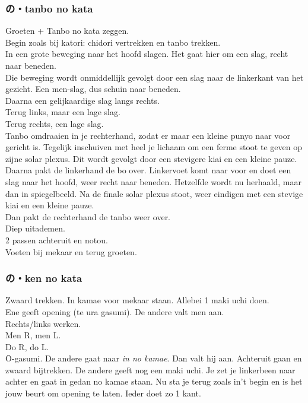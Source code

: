 \subsubsection{の・tanbo no kata}
Groeten + Tanbo no kata zeggen.\\
Begin zoals bij katori: chidori vertrekken en tanbo trekken.\\
In een grote beweging naar het hoofd slagen. Het gaat hier om een slag, recht naar beneden.\\
Die beweging wordt onmiddellijk gevolgt door een slag naar de linkerkant van het gezicht. Een men-slag, dus schuin naar beneden.\\
Daarna een gelijkaardige slag langs rechts.\\
Terug links, maar een lage slag.\\
Terug rechts, een lage slag.\\
Tanbo omdraaien in je rechterhand, zodat er maar een kleine punyo naar voor gericht is. Tegelijk inschuiven met heel je lichaam om een ferme stoot te geven op zijne solar plexus. Dit wordt gevolgt door een stevigere kiai en een kleine pauze.\\
Daarna pakt de linkerhand de bo over. Linkervoet komt naar voor en doet een slag naar het hoofd, weer recht naar beneden. Hetzelfde wordt nu herhaald, maar dan in spiegelbeeld. Na de finale solar plexus stoot, weer eindigen met een stevige kiai en een kleine pauze.\\
Dan pakt de rechterhand de tanbo weer over.\\
Diep uitademen.\\
2 passen achteruit en notou.\\
Voeten bij mekaar en terug groeten.

\subsubsection{の・ken no kata}
Zwaard trekken. In kamae voor mekaar staan. Allebei 1 maki uchi doen.\\
Ene geeft opening (te ura gasumi). De andere valt men aan.\\
Rechts/links werken.\\
Men R, men L.\\
Do R, do L.\\
\={O}-gasumi. De andere gaat naar \textit{in no kamae}. Dan valt hij aan. Achteruit gaan en zwaard bijtrekken.
De andere geeft nog een maki uchi. Je zet je linkerbeen naar achter en gaat in gedan no kamae staan.
Nu sta je terug zoals in't begin en is het jouw beurt om opening te laten.
Ieder doet zo 1 kant.

